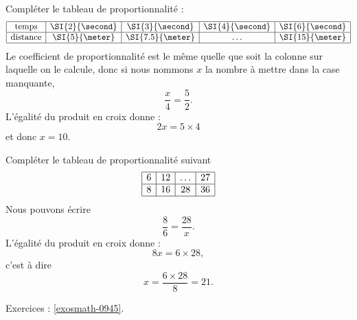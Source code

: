 \begin{example}
    Compléter le tableau de proportionnalité :
    \begin{equation*}
        \begin{array}[]{|c|c|c|c|c|}
            \hline
            \text{temps}&\SI{2}{\second}&\SI{3}{\second}&\SI{4}{\second}&\SI{6}{\second}\\
            \hline
            \text{distance}&\SI{5}{\meter}&\SI{7.5}{\meter}&\ldots&\SI{15}{\meter}\\
            \hline
        \end{array}
    \end{equation*}
    Le coefficient de proportionnalité est le même quelle que soit la colonne sur laquelle on le calcule, donc si nous nommons \( x\) la nombre à mettre dans la case manquante,
    \begin{equation}
        \frac{ x }{ 4 }=\frac{ 5 }{ 2 }.
    \end{equation}
    L'égalité du produit en croix donne : 
    \begin{equation}
        2x=5\times 4
    \end{equation}
    et donc \( x=10\).
\end{example}

\begin{example}
    Compléter le tableau de proportionnalité suivant
    \begin{equation*}
        \begin{array}[]{|c|c|c|c|}
            \hline
             6&12&\ldots&27\\
              \hline
              8&16&28&36\\ 
              \hline 
               \end{array}
    \end{equation*}
    Nous pouvons écrire
    \begin{equation}
        \frac{ 8 }{ 6 }=\frac{ 28 }{ x }.
    \end{equation}
    L'égalité du produit en croix donne :
    \begin{equation}
        8x=6\times 28,
    \end{equation}
    c'est à dire
    \begin{equation}
        x=\frac{ 6\times 28 }{ 8 }=21.
    \end{equation}
\end{example}

Exercices : \ref{exosmath-0945}.

